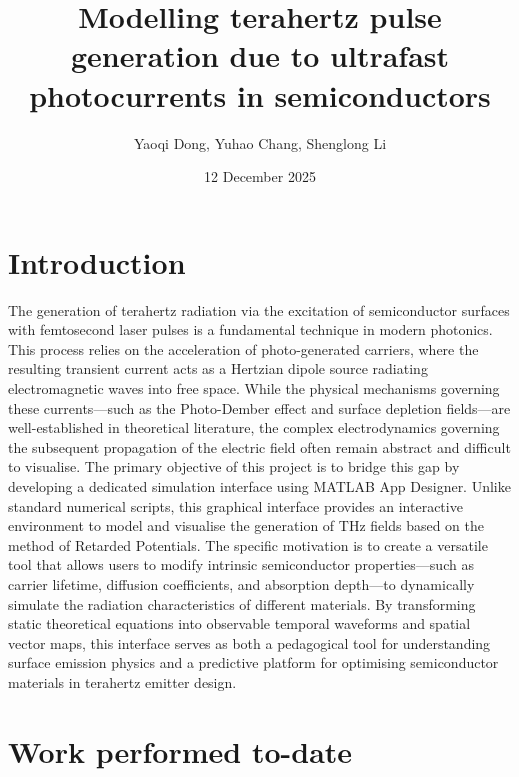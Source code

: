 \documentclass[12pt]{interim_report}
\title{Modelling terahertz pulse generation due to ultrafast photocurrents in semiconductors }
\author{Yaoqi Dong, Yuhao Chang, Shenglong Li}
\date{12 December 2025}
\begin{document}
\coverpage
\declaration
\maketitle

\tableofcontents
\section{Introduction}
The generation of terahertz radiation via the excitation of semiconductor surfaces with femtosecond laser pulses is a fundamental technique in modern photonics. This process relies on the acceleration of photo-generated carriers, where the resulting transient current acts as a Hertzian dipole source radiating electromagnetic waves into free space. While the physical mechanisms governing these currents—such as the Photo-Dember effect and surface depletion fields—are well-established in theoretical literature, the complex electrodynamics governing the subsequent propagation of the electric field often remain abstract and difficult to visualise.
\newline
The primary objective of this project is to bridge this gap by developing a dedicated simulation interface using MATLAB App Designer. Unlike standard numerical scripts, this graphical interface provides an interactive environment to model and visualise the generation of THz fields based on the method of Retarded Potentials. The specific motivation is to create a versatile tool that allows users to modify intrinsic semiconductor properties—such as carrier lifetime, diffusion coefficients, and absorption depth—to dynamically simulate the radiation characteristics of different materials. By transforming static theoretical equations into observable temporal waveforms and spatial vector maps, this interface serves as both a pedagogical tool for understanding surface emission physics and a predictive platform for optimising semiconductor materials in terahertz emitter design.
\section{Work performed to-date}
\end{document}
